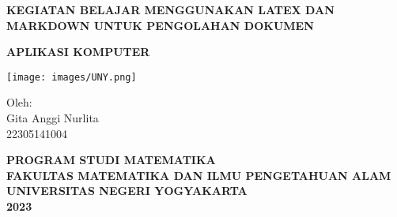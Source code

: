 \documentclass[12pt,times new roman,a4paper]{book}
\begin{document}
\clearpage
\thispagestyle{empty}
\frontmatter
\begin{center}
    \large{\textbf{KEGIATAN BELAJAR MENGGUNAKAN LATEX DAN MARKDOWN UNTUK PENGOLAHAN DOKUMEN}}
    
    \vspace{2cm}

    \large{\textbf{APLIKASI KOMPUTER}}
\end{center}
\vspace{3cm}
\begin{minipage}{17cm}
    \begin{center}
          \texttt{[image: images/UNY.png]}
    \end{center}
\end{minipage}

\vspace{3cm}

\begin{center}
    \large{Oleh: \\ Gita Anggi Nurlita \\ 22305141004}
\end{center}

\vspace{3cm}
\begin{center}
    \large{\textbf{PROGRAM STUDI MATEMATIKA}} \\
    \large{\textbf{FAKULTAS MATEMATIKA DAN ILMU PENGETAHUAN ALAM}} \\
    \large{\textbf{UNIVERSITAS NEGERI YOGYAKARTA}} \\
    \large{\textbf{2023}}
\end{center}

\clearpage
\thispagestyle{empty}
\tableofcontents
\mainmatter
\end{document}
